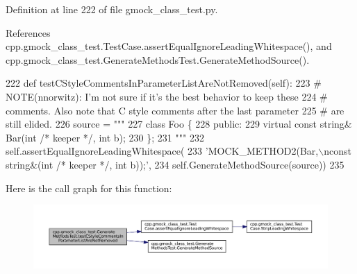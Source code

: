 Definition at line 222 of file gmock\+\_\+class\+\_\+test.\+py.



References cpp.\+gmock\+\_\+class\+\_\+test.\+Test\+Case.\+assert\+Equal\+Ignore\+Leading\+Whitespace(), and cpp.\+gmock\+\_\+class\+\_\+test.\+Generate\+Methods\+Test.\+Generate\+Method\+Source().


\begin{DoxyCode}
222   \textcolor{keyword}{def }testCStyleCommentsInParameterListAreNotRemoved(self):
223     \textcolor{comment}{# NOTE(nnorwitz): I'm not sure if it's the best behavior to keep these}
224     \textcolor{comment}{# comments.  Also note that C style comments after the last parameter}
225     \textcolor{comment}{# are still elided.}
226     source = \textcolor{stringliteral}{"""}
227 \textcolor{stringliteral}{class Foo \{}
228 \textcolor{stringliteral}{ public:}
229 \textcolor{stringliteral}{  virtual const string& Bar(int /* keeper */, int b);}
230 \textcolor{stringliteral}{\};}
231 \textcolor{stringliteral}{"""}
232     self.assertEqualIgnoreLeadingWhitespace(
233         \textcolor{stringliteral}{'MOCK\_METHOD2(Bar,\(\backslash\)nconst string&(int /* keeper */, int b));'},
234         self.GenerateMethodSource(source))
235 
\end{DoxyCode}
Here is the call graph for this function\+:
\nopagebreak
\begin{figure}[H]
\begin{center}
\leavevmode
\includegraphics[width=350pt]{classcpp_1_1gmock__class__test_1_1GenerateMethodsTest_afa44c6ac675ce7454ff0f51164bde59e_cgraph}
\end{center}
\end{figure}
\mbox{\label{classcpp_1_1gmock__class__test_1_1GenerateMethodsTest_a61abb614ad02a1fef3ece3813695c22a}} 
